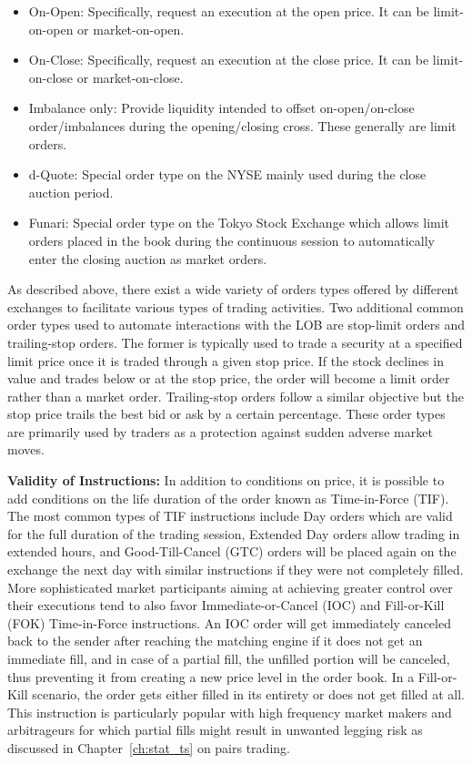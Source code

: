 \begin{itemize}
\item On-Open: Specifically, request an execution at the open price. It can be limit-on-open or market-on-open.

\item On-Close: Specifically, request an execution at the close price. It can be limit-on-close or market-on-close.

\item Imbalance only: Provide liquidity intended to offset on-open/on-close order/imbalances during the opening/closing cross. These generally are limit orders.

\item d-Quote: Special order type on the NYSE mainly used during the close auction period.

\item Funari: Special order type on the Tokyo Stock Exchange which allows limit orders placed in the book during the continuous session to automatically enter the closing auction as market orders. 
\end{itemize}


As described above, there exist a wide variety of orders types offered by different exchanges to facilitate various types of trading activities. Two additional common order types used to automate interactions with the LOB are stop-limit orders and trailing-stop orders. The former is typically used to trade a security at a specified limit price once it is traded through a given stop price. If the stock declines in value and trades below or at the stop price, the order will become a limit order rather than a market order. Trailing-stop orders follow a similar objective but the stop price trails the best bid or ask by a certain percentage. These order types are primarily used by traders as a protection against sudden adverse market moves. \twomedskip


\noindent\textbf{Validity of Instructions:} In addition to conditions on price, it is possible to add conditions on the life duration of the order known as Time-in-Force (TIF). The most common types of TIF instructions include Day orders which are valid for the full duration of the trading session, Extended Day orders allow trading in extended hours, and Good-Till-Cancel (GTC) orders will be placed again on the exchange the next day with similar instructions if they were not completely filled. More sophisticated market participants aiming at achieving greater control over their executions tend to also favor Immediate-or-Cancel (IOC) and Fill-or-Kill (FOK) Time-in-Force instructions. An IOC order will get immediately canceled back to the sender after reaching the matching engine if it does not get an immediate fill, and in case of a partial fill, the unfilled portion will be canceled, thus preventing it from creating a new price level in the order book. In a Fill-or-Kill scenario, the order gets either filled in its entirety or does not get filled at all. This instruction is particularly popular with high frequency market makers and arbitrageurs for which partial fills might result in unwanted legging risk as discussed in Chapter~\ref{ch:stat_ts} on pairs trading.


